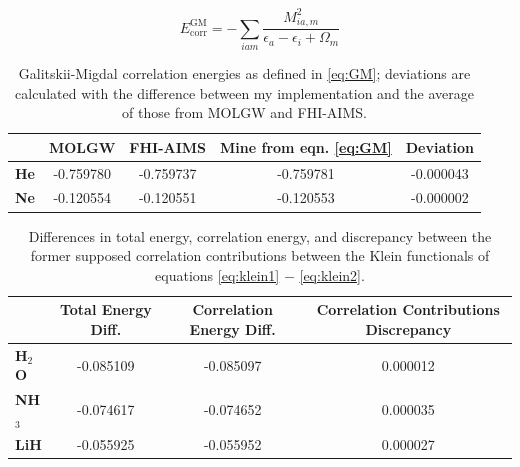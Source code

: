 \documentclass[12pt]{caltech_thesis}
\begin{document}
\begin{equation}
E_{\mathrm{corr}}^{\mathrm{GM}}=-\sum_{i a m} \frac{M_{i a, m}^2}{\epsilon_a-\epsilon_i+\Omega_m}
\label{eq:GM}
\end{equation}

\begin{table}[h!]
    \centering
    \begin{tabular}{lcccc}
        \toprule
        & \textbf{MOLGW} & \textbf{FHI-AIMS} & \textbf{Mine from eqn. \ref{eq:GM}} & \textbf{Deviation} \\
        \midrule
        \textbf{He} & -0.759780 & -0.759737 & -0.759781 & -0.000043 \\
        \textbf{Ne} & -0.120554 & -0.120551 & -0.120553 & -0.000002 \\
        \bottomrule
    \end{tabular}
    \caption{Galitskii-Migdal correlation energies as defined in \ref{eq:GM}; deviations are calculated with the difference between my implementation and the average of those from MOLGW and FHI-AIMS.}
    \label{tab:galitskii}
\end{table}



\begin{table}[h!]
\centering
\begin{tabular}{lccc}
\toprule
& \textbf{Total Energy Diff.} & \textbf{Correlation Energy Diff.} & \textbf{Correlation Contributions Discrepancy} \\
\midrule
\textbf{H$_2$O} & -0.085109 & -0.085097 & 0.000012 \\
\textbf{NH$_3$} & -0.074617 & -0.074652 & 0.000035 \\
\textbf{LiH} & -0.055925 & -0.055952 & 0.000027 \\
\bottomrule
\end{tabular}
\caption{Differences in total energy, correlation energy, and discrepancy between the former supposed correlation contributions between the Klein functionals of equations \ref{eq:klein1} $-$ \ref{eq:klein2}.}
\label{tab:klein}
\end{table}
\end{document}
